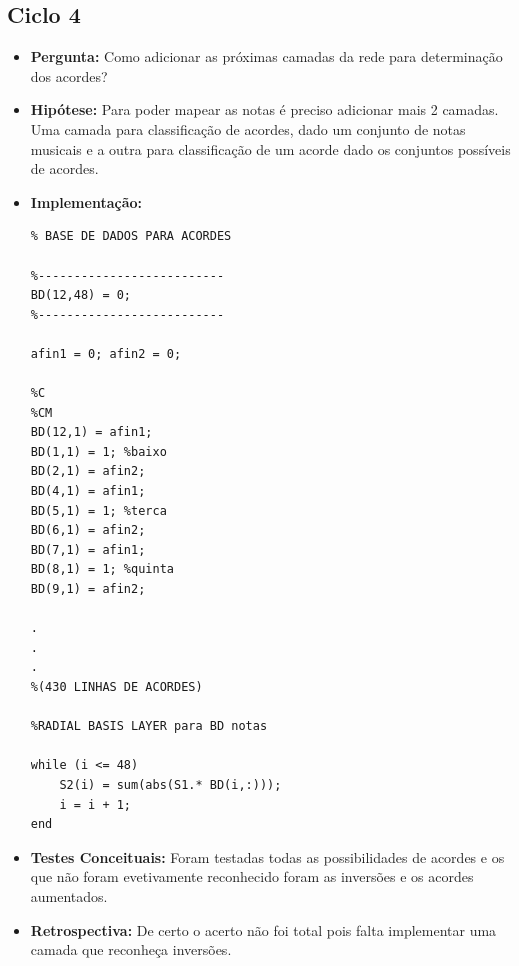 \subsection{Ciclo 4}
\label{subsec:ciclo_4}
\begin{itemize}
\item \textbf{Pergunta:} Como adicionar as próximas camadas da rede para determinação dos acordes?
\item \textbf{Hipótese:} Para poder mapear as notas é preciso adicionar mais 2 camadas. Uma camada para classificação de acordes, dado um conjunto de notas musicais e a outra para classificação de um acorde dado os conjuntos possíveis de acordes.
\item \textbf{Implementação:} 
\begin{lstlisting}
% BASE DE DADOS PARA ACORDES

%--------------------------
BD(12,48) = 0;
%--------------------------

afin1 = 0; afin2 = 0;

%C
%CM
BD(12,1) = afin1;
BD(1,1) = 1; %baixo
BD(2,1) = afin2;
BD(4,1) = afin1;
BD(5,1) = 1; %terca
BD(6,1) = afin2;
BD(7,1) = afin1;
BD(8,1) = 1; %quinta
BD(9,1) = afin2;

.
.
.
%(430 LINHAS DE ACORDES)

%RADIAL BASIS LAYER para BD notas

while (i <= 48)
    S2(i) = sum(abs(S1.* BD(i,:)));
    i = i + 1;
end

\end{lstlisting}
\item \textbf{Testes Conceituais:} Foram testadas todas as possibilidades de acordes e os que não foram evetivamente reconhecido foram as inversões e os acordes aumentados.
\item \textbf{Retrospectiva:} De certo o acerto não foi total pois falta implementar uma camada que reconheça inversões.
\end{itemize}


